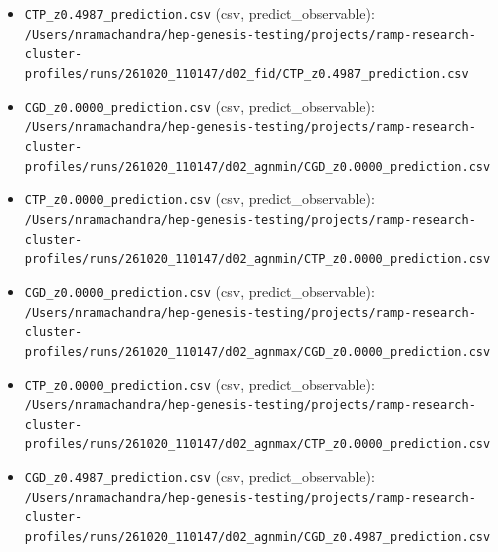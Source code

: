 \documentclass[11pt,a4paper]{article}
\begin{document}
\begin{itemize}
  \item \texttt{CTP\_\allowbreak{}z0.4987\_\allowbreak{}prediction.csv} (csv, predict\_observable): \texttt{/\allowbreak{}Users/\allowbreak{}nramachandra/\allowbreak{}hep-genesis-testing/\allowbreak{}projects/\allowbreak{}ramp-research-cluster-profiles/\allowbreak{}runs/\allowbreak{}261020\_\allowbreak{}110147/\allowbreak{}d02\_\allowbreak{}fid/\allowbreak{}CTP\_\allowbreak{}z0.4987\_\allowbreak{}prediction.csv}
  \item \texttt{CGD\_\allowbreak{}z0.0000\_\allowbreak{}prediction.csv} (csv, predict\_observable): \texttt{/\allowbreak{}Users/\allowbreak{}nramachandra/\allowbreak{}hep-genesis-testing/\allowbreak{}projects/\allowbreak{}ramp-research-cluster-profiles/\allowbreak{}runs/\allowbreak{}261020\_\allowbreak{}110147/\allowbreak{}d02\_\allowbreak{}agnmin/\allowbreak{}CGD\_\allowbreak{}z0.0000\_\allowbreak{}prediction.csv}
  \item \texttt{CTP\_\allowbreak{}z0.0000\_\allowbreak{}prediction.csv} (csv, predict\_observable): \texttt{/\allowbreak{}Users/\allowbreak{}nramachandra/\allowbreak{}hep-genesis-testing/\allowbreak{}projects/\allowbreak{}ramp-research-cluster-profiles/\allowbreak{}runs/\allowbreak{}261020\_\allowbreak{}110147/\allowbreak{}d02\_\allowbreak{}agnmin/\allowbreak{}CTP\_\allowbreak{}z0.0000\_\allowbreak{}prediction.csv}
  \item \texttt{CGD\_\allowbreak{}z0.0000\_\allowbreak{}prediction.csv} (csv, predict\_observable): \texttt{/\allowbreak{}Users/\allowbreak{}nramachandra/\allowbreak{}hep-genesis-testing/\allowbreak{}projects/\allowbreak{}ramp-research-cluster-profiles/\allowbreak{}runs/\allowbreak{}261020\_\allowbreak{}110147/\allowbreak{}d02\_\allowbreak{}agnmax/\allowbreak{}CGD\_\allowbreak{}z0.0000\_\allowbreak{}prediction.csv}
  \item \texttt{CTP\_\allowbreak{}z0.0000\_\allowbreak{}prediction.csv} (csv, predict\_observable): \texttt{/\allowbreak{}Users/\allowbreak{}nramachandra/\allowbreak{}hep-genesis-testing/\allowbreak{}projects/\allowbreak{}ramp-research-cluster-profiles/\allowbreak{}runs/\allowbreak{}261020\_\allowbreak{}110147/\allowbreak{}d02\_\allowbreak{}agnmax/\allowbreak{}CTP\_\allowbreak{}z0.0000\_\allowbreak{}prediction.csv}
  \item \texttt{CGD\_\allowbreak{}z0.4987\_\allowbreak{}prediction.csv} (csv, predict\_observable): \texttt{/\allowbreak{}Users/\allowbreak{}nramachandra/\allowbreak{}hep-genesis-testing/\allowbreak{}projects/\allowbreak{}ramp-research-cluster-profiles/\allowbreak{}runs/\allowbreak{}261020\_\allowbreak{}110147/\allowbreak{}d02\_\allowbreak{}agnmin/\allowbreak{}CGD\_\allowbreak{}z0.4987\_\allowbreak{}prediction.csv}

\end{itemize}
\end{document}

